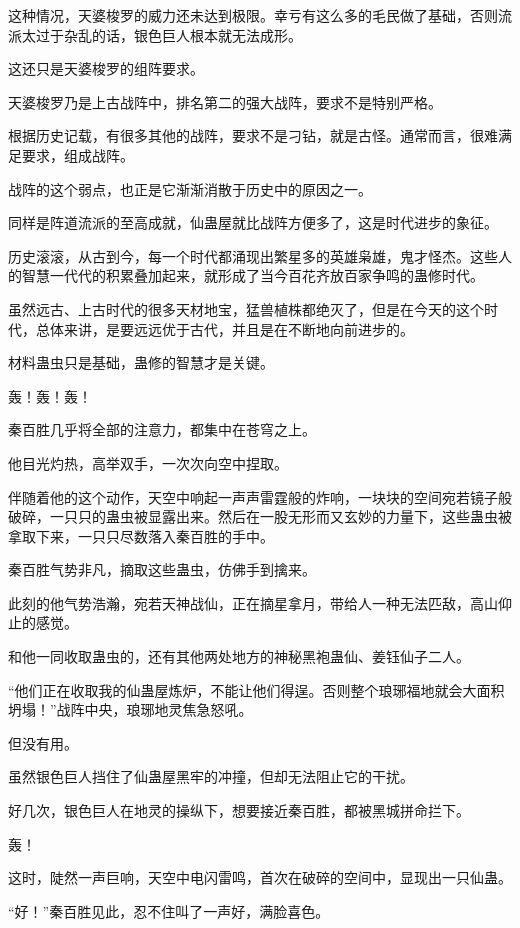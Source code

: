 \begin{this_body}
这种情况，天婆梭罗的威力还未达到极限。幸亏有这么多的毛民做了基础，否则流派太过于杂乱的话，银色巨人根本就无法成形。

这还只是天婆梭罗的组阵要求。

天婆梭罗乃是上古战阵中，排名第二的强大战阵，要求不是特别严格。

根据历史记载，有很多其他的战阵，要求不是刁钻，就是古怪。通常而言，很难满足要求，组成战阵。

战阵的这个弱点，也正是它渐渐消散于历史中的原因之一。

同样是阵道流派的至高成就，仙蛊屋就比战阵方便多了，这是时代进步的象征。

历史滚滚，从古到今，每一个时代都涌现出繁星多的英雄枭雄，鬼才怪杰。这些人的智慧一代代的积累叠加起来，就形成了当今百花齐放百家争鸣的蛊修时代。

虽然远古、上古时代的很多天材地宝，猛兽植株都绝灭了，但是在今天的这个时代，总体来讲，是要远远优于古代，并且是在不断地向前进步的。

材料蛊虫只是基础，蛊修的智慧才是关键。

轰！轰！轰！

秦百胜几乎将全部的注意力，都集中在苍穹之上。

他目光灼热，高举双手，一次次向空中捏取。

伴随着他的这个动作，天空中响起一声声雷霆般的炸响，一块块的空间宛若镜子般破碎，一只只的蛊虫被显露出来。然后在一股无形而又玄妙的力量下，这些蛊虫被拿取下来，一只只尽数落入秦百胜的手中。

秦百胜气势非凡，摘取这些蛊虫，仿佛手到擒来。

此刻的他气势浩瀚，宛若天神战仙，正在摘星拿月，带给人一种无法匹敌，高山仰止的感觉。

和他一同收取蛊虫的，还有其他两处地方的神秘黑袍蛊仙、姜钰仙子二人。

“他们正在收取我的仙蛊屋炼炉，不能让他们得逞。否则整个琅琊福地就会大面积坍塌！”战阵中央，琅琊地灵焦急怒吼。

但没有用。

虽然银色巨人挡住了仙蛊屋黑牢的冲撞，但却无法阻止它的干扰。

好几次，银色巨人在地灵的操纵下，想要接近秦百胜，都被黑城拼命拦下。

轰！

这时，陡然一声巨响，天空中电闪雷鸣，首次在破碎的空间中，显现出一只仙蛊。

“好！”秦百胜见此，忍不住叫了一声好，满脸喜色。


\end{this_body}
